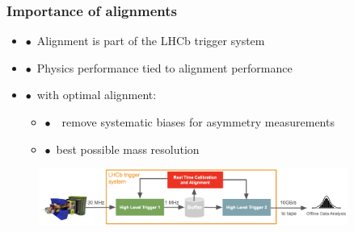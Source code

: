 \documentclass[aspectratio=1610, 12pt, xcolor=dvipsnames]{beamer}
\begin{document}
\begin{frame}\frametitle{Importance of alignments}
  \begin{itemize}
    \item $\bullet$\, Alignment is part of the LHCb trigger system
    \item $\bullet$\, Physics performance tied to alignment performance
    \item $\bullet$\, with optimal alignment:
    \begin{itemize}
      \item $\bullet$\, \to\, remove systematic biases for asymmetry measurements
      \item $\bullet$\, best possible mass resolution
    \end{itemize}
  \end{itemize}
  \begin{figure}
      \includegraphics[width=0.9\textwidth]{logos/dataflow.png}%
  \end{figure}
\end{frame}
\end{document}
